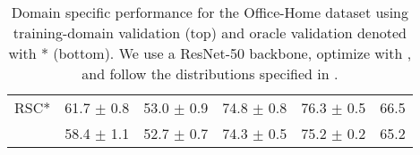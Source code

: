 \begin{table*}
\begin{center}
\begin{tabular}{lccccc}
RSC*                  & 61.7 $\pm$ 0.8       & 53.0 $\pm$ 0.9       & 74.8 $\pm$ 0.8       & 76.3 $\pm$ 0.5       & 66.5                \\
\tdivcams 	          & 58.4 $\pm$ 1.1       & 52.7 $\pm$ 0.7        & 74.3 $\pm$ 0.5       & 75.2 $\pm$ 0.2        & 65.2                 \\
\bottomrule
\end{tabular}
\caption[Domain specific performance for the Office-Home dataset]{Domain specific performance for the Office-Home dataset using training-domain validation (top) and  oracle validation denoted with * (bottom). We use a ResNet-50 backbone, optimize with \adam, and follow the distributions specified in \domainbed.}
\end{center}
\end{table*}

